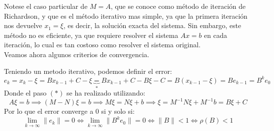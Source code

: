 Notese el caso particular de $M = A$, que se conoce como método de iteración de Richardson, y que es el método iterativo mas simple, ya que la primera iteración nos devuelve $x_1 = \xi$, es decir, la solución exacta del sistema. Sin embargo, este método no es eficiente, ya que requiere resolver el sistema $Ax = b$ en cada iteración, lo cual es tan costoso como resolver el sistema original.\\

Veamos ahora algunos criterios de convergencia.

\begin{proposición}
    Teniendo un metodo iterativo, podemos definir el error:
    \[
        e_k = 
        x_k - \xi = 
        Bx_{k-1} + C - \xi \underbrace{=}_{*}
        Bx_{k-1} + C - B\xi - C =
        B(x_{k-1} - \xi) =
        Be_{k-1} =
        B^k e_0
    \]
    Donde el paso $(*)$ se ha realizado utilizando:
    \[
        A \xi = b \implies
        (M - N)\xi = b \implies
        M\xi = N\xi + b \implies
        \xi = M^{-1}N\xi + M^{-1}b = B\xi + C
    \]
    Por lo que el error converge a 0 si y solo si:
    \[
        \lim_{k \to \infty} \| e_k \| = 0 \iff 
        \lim_{k \to \infty} \| B^k e_0 \| = 0 \iff
        \| B \| < 1 \iff
        \rho(B) < 1
    \]
\end{proposición}

